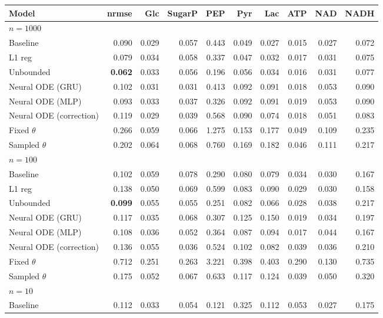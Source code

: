 \begin{tabular}{lrrrrrrrrr}
\toprule
Model & nrmse & Glc & SugarP & PEP & Pyr & Lac & ATP & NAD & NADH \\
\midrule
\multicolumn{10}{l}{\textbf{$n=1000$}} \\
Baseline & 0.090 & 0.029 & 0.057 & 0.443 & 0.049 & 0.027 & 0.015 & 0.027 & 0.072 \\
L1 reg & 0.079 & 0.034 & 0.058 & 0.337 & 0.047 & 0.032 & 0.017 & 0.031 & 0.075 \\
Unbounded & \textbf{0.062} & 0.033 & 0.056 & 0.196 & 0.056 & 0.034 & 0.016 & 0.031 & 0.077 \\
Neural ODE (GRU) & 0.102 & 0.031 & 0.031 & 0.413 & 0.092 & 0.091 & 0.018 & 0.053 & 0.090 \\
Neural ODE (MLP) & 0.093 & 0.033 & 0.037 & 0.326 & 0.092 & 0.091 & 0.019 & 0.053 & 0.090 \\
Neural ODE (correction) & 0.119 & 0.029 & 0.039 & 0.568 & 0.090 & 0.074 & 0.018 & 0.051 & 0.083 \\
Fixed $\theta$ & 0.266 & 0.059 & 0.066 & 1.275 & 0.153 & 0.177 & 0.049 & 0.109 & 0.235 \\
Sampled $\theta$ & 0.202 & 0.064 & 0.068 & 0.760 & 0.169 & 0.182 & 0.046 & 0.111 & 0.217 \\
\midrule
\multicolumn{10}{l}{\textbf{$n=100$}} \\
Baseline & 0.102 & 0.059 & 0.078 & 0.290 & 0.080 & 0.079 & 0.034 & 0.030 & 0.167 \\
L1 reg & 0.138 & 0.050 & 0.069 & 0.599 & 0.083 & 0.090 & 0.029 & 0.030 & 0.158 \\
Unbounded & \textbf{0.099} & 0.055 & 0.055 & 0.251 & 0.082 & 0.066 & 0.028 & 0.038 & 0.217 \\
Neural ODE (GRU) & 0.117 & 0.035 & 0.068 & 0.307 & 0.125 & 0.150 & 0.019 & 0.034 & 0.197 \\
Neural ODE (MLP) & 0.108 & 0.036 & 0.052 & 0.364 & 0.087 & 0.094 & 0.017 & 0.044 & 0.167 \\
Neural ODE (correction) & 0.136 & 0.055 & 0.036 & 0.524 & 0.102 & 0.082 & 0.039 & 0.036 & 0.210 \\
Fixed $\theta$ & 0.712 & 0.251 & 0.263 & 3.221 & 0.398 & 0.403 & 0.290 & 0.130 & 0.735 \\
Sampled $\theta$ & 0.175 & 0.052 & 0.067 & 0.633 & 0.117 & 0.124 & 0.039 & 0.050 & 0.320 \\
\midrule
\multicolumn{10}{l}{\textbf{$n=10$}} \\
Baseline & 0.112 & 0.033 & 0.054 & 0.121 & 0.325 & 0.112 & 0.053 & 0.027 & 0.175 \\

\end{tabular}
